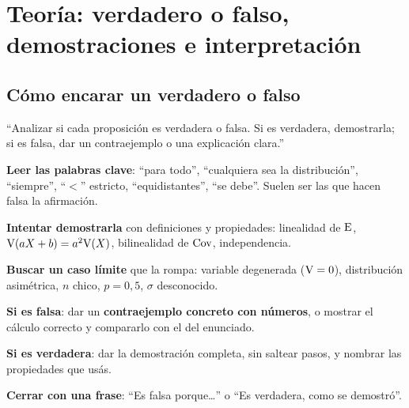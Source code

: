 \newpage
\section{Teoría: verdadero o falso, demostraciones e interpretación}

\subsection{Cómo encarar un verdadero o falso}\label{p:vf}
\begin{cuando}
``Analizar si cada proposición es verdadera o falsa. Si es verdadera, demostrarla; si es falsa, dar un contraejemplo o una explicación clara.''
\end{cuando}
\begin{pasos}
\begin{pasolista}
\item \textbf{Leer las palabras clave}: ``para todo'', ``cualquiera sea la distribución'', ``siempre'', ``$<$'' estricto, ``equidistantes'', ``se debe''. Suelen ser las que hacen falsa la afirmación.
\item \textbf{Intentar demostrarla} con definiciones y propiedades: linealidad de $\mathrm{E}$, $\mathrm{V}(aX+b)=a^2\mathrm{V}(X)$, bilinealidad de $\mathrm{Cov}$, independencia.
\item \textbf{Buscar un caso límite} que la rompa: variable degenerada ($\mathrm{V}=0$), distribución asimétrica, $n$ chico, $p=0{,}5$, $\sigma$ desconocido.
\item \textbf{Si es falsa}: dar un \textbf{contraejemplo concreto con números}, o mostrar el cálculo correcto y compararlo con el del enunciado.
\item \textbf{Si es verdadera}: dar la demostración completa, sin saltear pasos, y nombrar las propiedades que usás.
\item \textbf{Cerrar con una frase}: ``Es falsa porque\ldots'' o ``Es verdadera, como se demostró''.
\end{pasolista}
\end{pasos}
